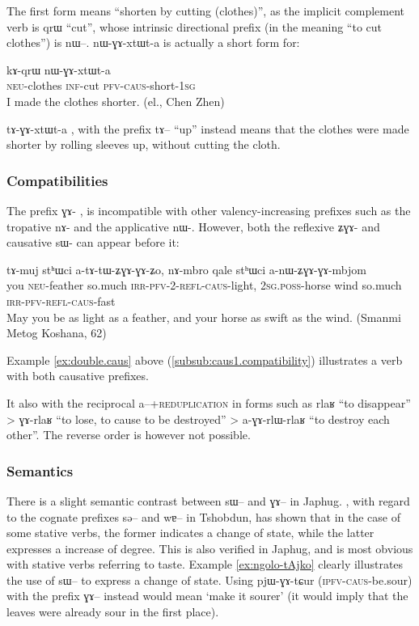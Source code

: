 \documentclass[oldfontcommands,oneside,a4paper,11pt]{article}
\newcommand{\ipa}[1]{{\phon \mbox{#1}}} %
\newcommand{\sg}{\textsc{sg}}
\newcommand{\pfv}{\textsc{pfv}}
\newcommand{\caus}{\textsc{caus}}
\newcommand{\inftv}{\textsc{inf}}
\newcommand{\irr}{\textsc{irr}}
\newcommand{\neu}{\textsc{neu}}
\newcommand{\poss}{\textsc{poss}}
\newcommand{\refl}{\textsc{refl}}
\begin{document}
 The first form means ``shorten by cutting (clothes)'', as the implicit complement verb is \ipa{qrɯ} ``cut'', whose intrinsic directional prefix (in the meaning ``to cut clothes'') is \ipa{nɯ}--.  \ipa{nɯ-ɣɤ-xtɯt-a} is actually a short form for:
 
   \begin{exe}
\ex 
 \gll  	\ipa{tɯ-ŋga} \ipa{kɤ-qrɯ} \ipa{nɯ-ɣɤ-xtɯt-a}  	   \\
 \neu{}-clothes \inftv{}-cut \pfv{}-\caus{}-short-1\sg      \\
 \glt    I made the clothes shorter. (el., Chen Zhen)
   \end{exe}
 \ipa{tɤ-ɣɤ-xtɯt-a} , with the prefix \ipa{tɤ}-- ``up'' instead means that the clothes were made shorter by rolling sleeves up, without cutting the cloth.
 
 
\subsubsection{Compatibilities} \label{subsub:caus2:compat}
The prefix \ipa{ɣɤ-} , is incompatible with other valency-increasing prefixes such as the tropative  \ipa{nɤ-} and the applicative  \ipa{nɯ-}. However, both the reflexive  \ipa{ʑɣɤ-}   and causative  \ipa{sɯ-} can appear before it:
 \begin{exe}
\ex 
\gll \ipa{nɤʑo}  	\ipa{tɤ-muj}  	\ipa{stʰɯci}  	\ipa{a-tɤ-tɯ-ʑɣɤ-ɣɤ-ʑo,}  	\ipa{nɤ-mbro}  	\ipa{qale}  	\ipa{stʰɯci}  	\ipa{a-nɯ-ʑɣɤ-ɣɤ-mbjom}  	  \\
you \neu{}-feather  so.much \irr{}-\pfv{}-2-\refl-\caus{}-light, 2\sg{}.\poss{}-horse wind so.much \irr{}-\pfv{}-\refl-\caus{}-fast \\
 \glt   May you be as light as a feather, and your horse as swift as the wind. (Smanmi Metog Koshana, 62)
   \end{exe}
Example  \ref{ex:double.caus} above (\ref{subsub:caus1.compatibility}) illustrates a verb with both causative prefixes.



It also with the reciprocal \ipa{a}--+\textsc{reduplication} in forms such as \ipa{rlaʁ}    ``to disappear'' > \ipa{ɣɤ-rlaʁ} ``to lose, to cause to be destroyed'' > \ipa{a-ɣɤ-rlɯ-rlaʁ} ``to destroy each other''. The reverse order is however not possible.
 

\subsubsection{Semantics} \label{subsub:caus-g:semantics}
There is a slight semantic contrast between \ipa{sɯ--} and \ipa{ɣɤ--} in Japhug. \citet{jackson06paisheng, jackson14morpho}, with regard to   the cognate prefixes \ipa{sə}-- and \ipa{wɐ}--  in Tshobdun, has shown that in the case of some stative verbs, the former indicates a change of state, while the latter expresses a increase of degree. This is also verified in Japhug, and is most obvious with stative verbs referring to taste. Example \ref{ex:ngolo-tAjko} clearly illustrates the use of \ipa{sɯ--} to express a change of state. Using \ipa{pjɯ-ɣɤ-tɕur} (\textsc{ipfv-caus}-be.sour) with the prefix \ipa{ɣɤ--} instead would mean `make it sourer' (it would imply that the leaves were already sour in the first place).
\end{document}
